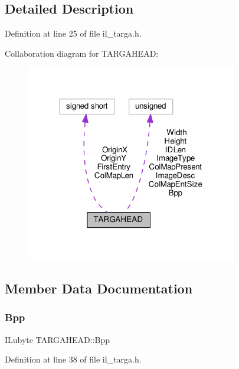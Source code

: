 \subsection{Detailed Description}


Definition at line 25 of file il\+\_\+targa.\+h.



Collaboration diagram for T\+A\+R\+G\+A\+H\+E\+AD\+:
\nopagebreak
\begin{figure}[H]
\begin{center}
\leavevmode
\includegraphics[width=262pt]{d9/d66/structTARGAHEAD__coll__graph}
\end{center}
\end{figure}


\subsection{Member Data Documentation}
\mbox{\label{structTARGAHEAD_a2044816beeb48ada1f467680b4625eb1}} 
\subsubsection{\texorpdfstring{Bpp}{Bpp}}
{\footnotesize\ttfamily I\+Lubyte T\+A\+R\+G\+A\+H\+E\+A\+D\+::\+Bpp}



Definition at line 38 of file il\+\_\+targa.\+h.

\mbox{\label{structTARGAHEAD_ab50dfb80335ba07f130d306995b6c8b3}} 

